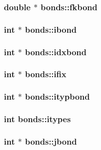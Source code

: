 \subsubsection{\setlength{\rightskip}{0pt plus 5cm}double $\ast$ {\bf bonds::fkbond}}\label{structbonds_a10f844137c98fbf452879959487aab9}


\subsubsection{\setlength{\rightskip}{0pt plus 5cm}int $\ast$ {\bf bonds::ibond}}\label{structbonds_56735400893b519fb90fb28a2e58e123}


\subsubsection{\setlength{\rightskip}{0pt plus 5cm}int $\ast$ {\bf bonds::idxbond}}\label{structbonds_a655bd7dce8142ee84c706d7e18d5317}


\subsubsection{\setlength{\rightskip}{0pt plus 5cm}int $\ast$ {\bf bonds::ifix}}\label{structbonds_2d53a3dee30be6682ef1bd30ce2edda6}


\subsubsection{\setlength{\rightskip}{0pt plus 5cm}int $\ast$ {\bf bonds::itypbond}}\label{structbonds_35451f43ad0c48d87468499e2f035280}


\subsubsection{\setlength{\rightskip}{0pt plus 5cm}int {\bf bonds::itypes}}\label{structbonds_79a0e9c3b0df6709bf7a455b35f4b75d}


\subsubsection{\setlength{\rightskip}{0pt plus 5cm}int $\ast$ {\bf bonds::jbond}}\label{structbonds_4f30a8ef6740c817216c804c033f5f7e}


